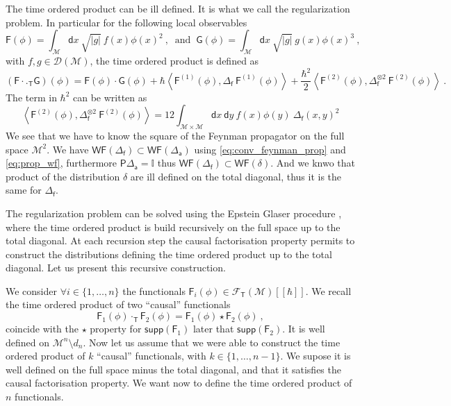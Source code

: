 \documentclass[12pt]{book}
\newcommand{\supp}{\mathsf{supp}}
\newcommand{\WF}{\mathsf{WF}}
\newcommand{\abs}[1]{\left|#1\right|}
\newcommand{\sm}[1]{\left\langle#1\right\rangle}
\let\int\int
\newcommand{\Dcal}{\mathcal{D}}
\newcommand{\Fcal}{\mathcal{F}}
\newcommand{\Mcal}{\mathcal{M}}
\newcommand{\Ibb}{\mathbb{I}}
\newcommand{\Fsf}{\mathsf{F}}
\newcommand{\Gsf}{\mathsf{G}}
\newcommand{\Psf}{\mathsf{P}}
\newcommand{\Tsf}{\mathsf{T}}
\newcommand{\asf}{\mathsf{a}}
\newcommand{\dsf}{\mathsf{d}}
\newcommand{\fsf}{\mathsf{f}}
\theoremstyle{break}
\begin{document}
The time ordered product can be ill defined. It is what we call the regularization problem. In particular for the following local observables
%
\begin{equation*}
\Fsf(\phi) = \int_\Mcal \dsf x \ \sqrt{\abs{g}} \ f(x) \phi(x)^2 \ , \ \mbox{ and } \ 
\Gsf(\phi) = \int_\Mcal \dsf x \ \sqrt{\abs{g}} \ g(x) \phi(x)^3 \ ,
\end{equation*}
%
with $f, g \in \Dcal(\Mcal)$, the time ordered product is defined as
%
\begin{equation*}
(\Fsf \cdot._\Tsf \Gsf)(\phi) = \Fsf(\phi) \cdot \Gsf(\phi) + \hbar \sm{ \Fsf^{(1)}(\phi) , \Delta_\fsf \ \Fsf^{(1)}(\phi) } + \frac{\hbar^2}{2} \sm{ \Fsf^{(2)}(\phi) , \Delta_\fsf^{\otimes 2} \ \Fsf^{(2)}(\phi) } \ .
\end{equation*}
%
The term in $\hbar^2$ can be written as
%
\begin{equation*}
\sm{ \Fsf^{(2)}(\phi) , \Delta_\fsf^{\otimes 2} \ \Fsf^{(2)}(\phi) }  = 
12 \int_{\Mcal \times \Mcal} \dsf x \ \dsf y \ f(x) \phi(y) \ \Delta_\fsf(x,y)^2
\end{equation*}
%
We see that we have to know the square of the Feynman propagator on the full space $\Mcal^2$. We have $\WF(\Delta_\fsf) \subset \WF(\Delta_\asf)$ using \eqref{eq:conv_feynman_prop} and \eqref{eq:prop_wf}, furthermore $\Psf\Delta_\asf=\Ibb$ thus $\WF(\Delta_\fsf) \subset \WF(\delta)$. And we knwo that product of the distribution $\delta$ are ill defined on the total diagonal, thus it is the same for $\Delta_\fsf$.




The regularization problem can be solved using the Epstein Glaser procedure \cite{brunetti_microlocal_2000}, where the time ordered product is build recursively on the full space up to the total diagonal. At each recursion step the causal factorisation property permits to construct the distributions defining the time ordered product up to the total diagonal. Let us present this recursive construction. 




We consider $\forall i \in \{1,\dots,n\}$ the functionals $\Fsf_i(\phi) \in \Fcal_\Tsf(\Mcal)[[\hbar]]$. We recall the time ordered product of two ``causal'' functionals 
%
\begin{equation*}
\Fsf_1(\phi) \cdot_\Tsf \Fsf_2(\phi) = \Fsf_1(\phi) \star \Fsf_2(\phi) \ ,
\end{equation*}
%
coincide with the $\star$ property for $\supp(\Fsf_1)$ later that $\supp(\Fsf_2)$. It is well defined on $\Mcal^n \setminus d_n$. Now let us assume that we were able to construct the time ordered product of $k$ ``causal'' functionals, with $k \in \{1,\dots,n-1\}$. We supose it is well defined on the full space minus the total diagonal, and that it satisfies the causal factorisation property. We want now to define the time ordered product of $n$ functionals.
\end{document}
